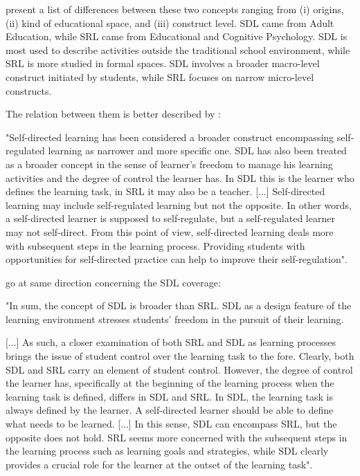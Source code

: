  present a list of differences between these two concepts ranging from (i) origins, (ii) kind of educational space, and (iii) construct level. \gls{SDL} came from Adult Education, while \gls{SRL} came from Educational and Cognitive Psychology. \gls{SDL} is most used to describe activities outside the traditional school environment, while \gls{SRL} is more studied in formal spaces. \gls{SDL} involves a broader macro-level construct initiated by students, while \gls{SRL} focuses on narrow micro-level constructs.

The relation between them is better described by \cite[p.~192]{saks:2014}:
\begin{citacao}
    "Self-directed learning has been considered a broader construct encompassing self-regulated learning as narrower and more specific one. SDL has also been treated as a broader concept in the sense of learner's freedom to manage his learning activities and the degree of control the learner has. In SDL this is the learner who defines the learning task, in SRL it may also be a teacher. [...] Self-directed learning may include self-regulated learning but not the opposite. In other words, a self-directed learner is supposed to self-regulate, but a self-regulated learner may not self-direct. From this point of view, self-directed learning deals more with subsequent steps in the learning process. Providing students with opportunities for self-directed practice can help to improve their self-regulation".
\end{citacao}
 go at same direction concerning the \gls{SDL} coverage:
\begin{citacao}
    "In sum, the concept of SDL is broader than SRL. SDL as a design feature of the learning environment stresses students' freedom in the pursuit of their learning. 
    
    [...] As such, a closer examination of both SRL and SDL as learning processes brings the issue of student control over the learning task to the fore. Clearly, both SDL and SRL carry an element of student control. However, the degree of control the learner has, specifically at the beginning of the learning process when the learning task is defined, differs in SDL and SRL. In SDL, the learning task is always defined by the learner. A self-directed learner should be able to define what needs to be learned. [...] In this sense, SDL can encompass SRL, but the opposite does not hold. SRL seems more concerned with the subsequent steps in the learning process such as learning goals and strategies, while SDL clearly provides a crucial role for the learner at the outset of the learning task".
\end{citacao}